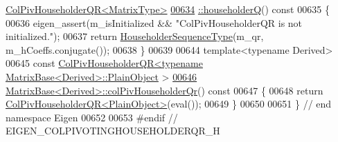\begin{DoxyCode}
       \hyperlink{group___q_r___module_a28ab9d8916ca609c5469c4c192fbfa28}{ColPivHouseholderQR<MatrixType>}
\hyperlink{group___q_r___module_a28ab9d8916ca609c5469c4c192fbfa28}{00634} \hyperlink{group___q_r___module_a28ab9d8916ca609c5469c4c192fbfa28}{  ::householderQ}()\textcolor{keyword}{ const}
00635 \textcolor{keyword}{}\{
00636   eigen\_assert(m\_isInitialized && \textcolor{stringliteral}{"ColPivHouseholderQR is not initialized."});
00637   \textcolor{keywordflow}{return} \hyperlink{group___householder___module_class_eigen_1_1_householder_sequence}{HouseholderSequenceType}(m\_qr, m\_hCoeffs.conjugate());
00638 \}
00639 
00644 \textcolor{keyword}{template}<\textcolor{keyword}{typename} Derived>
00645 \textcolor{keyword}{const} \hyperlink{group___q_r___module_class_eigen_1_1_col_piv_householder_q_r}{ColPivHouseholderQR<typename MatrixBase<Derived>::PlainObject}
      >
\hyperlink{group___core___module_adee8c19c833245bbb00a591dce68e8a4}{00646} \hyperlink{group___core___module_adee8c19c833245bbb00a591dce68e8a4}{MatrixBase<Derived>::colPivHouseholderQr}()\textcolor{keyword}{ const}
00647 \textcolor{keyword}{}\{
00648   \textcolor{keywordflow}{return} \hyperlink{group___q_r___module_class_eigen_1_1_col_piv_householder_q_r}{ColPivHouseholderQR<PlainObject>}(eval());
00649 \}
00650 
00651 \} \textcolor{comment}{// end namespace Eigen}
00652 
00653 \textcolor{preprocessor}{#endif // EIGEN\_COLPIVOTINGHOUSEHOLDERQR\_H}
\end{DoxyCode}
